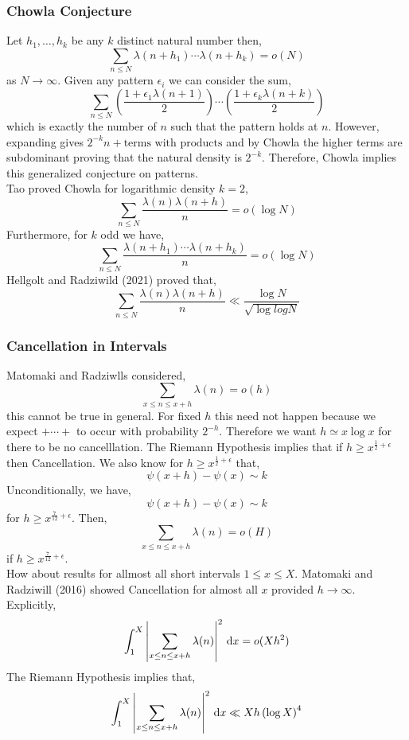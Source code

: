 \documentclass[12pt]{article}
\begin{document}
\subsubsection{Chowla Conjecture}

Let $h_1, \dots, h_k$ be any $k$ distinct natural number then,
\[ \sum_{n \le N} \lambda(n + h_1)  \cdots \lambda(n + h_k) = o(N) \]
as $N \to \infty$. Given any pattern $\epsilon_i$ we can consider the sum,
\[ \sum_{n \le N} \left( \frac{1 + \epsilon_1 \lambda(n+1)}{2} \right) \cdots \left( \frac{1 + \epsilon_k \lambda(n+k)}{2} \right) \]
which is exactly the number of $n$ such that the pattern holds at $n$. However, expanding gives $2^{-k} n + \text{terms with products}$ and by Chowla the higher terms are subdominant proving that the natural density is $2^{-k}$. Therefore, Chowla implies this generalized conjecture on patterns. 
\bigskip\\
Tao proved Chowla for logarithmic density $k = 2$,
\[ \sum_{n \le N} \frac{\lambda(n) \lambda(n + h)}{n} = o(\log{N}) \]
Furthermore, for $k$ odd we have,
\[ \sum_{n \le N} \frac{\lambda(n + h_1) \cdots \lambda(n + h_k)}{n} = o(\log{N}) \]
Hellgolt and Radziwild (2021) proved that,
\[ \sum_{n \le N} \frac{\lambda(n) \lambda(n+h)}{n} \ll \frac{\log{N}}{\sqrt{\log{log{N}}}} \]

\subsubsection{Cancellation in Intervals}

Matomaki and Radziwlls considered,
\[ \sum_{x \le n \le x + h} \lambda(n) = o(h) \]
this cannot be true in general. 
For fixed $h$ this need not happen because we expect $+ \cdots +$ to occur with probability $2^{-h}$. Therefore we want $h \simeq x \log{x}$ for there to be no cancelllation. The Riemann Hypothesis implies that if $h \ge x^{\frac{1}{2} + \epsilon}$ then Cancellation. We also know for $h \ge x^{\frac{1}{2} + \epsilon}$ that,
\[ \psi(x + h) - \psi(x) \sim k \]
Unconditionally, we have,
\[ \psi(x + h) - \psi(x) \sim k \]
for $h \ge x^{\frac{7}{12} + \epsilon}$. Then,
\[ \sum_{x \le n \le x + h} \lambda(n) = o(H) \]
if $h \ge x^{\frac{7}{12} + \epsilon}$.
\bigskip\\
How about results for allmost all short intervals $1 \le x \le X$. Matomaki and Radziwill (2016) showed Cancellation for almost all $x$ provided $h \to \infty$. Explicitly,
\[ \int_1^X \left| \sum_{x \le n \le x + h} \lambda(n) \right|^2 \, \mathrm{d}{x} = o(X h^2) \]
The Riemann Hypothesis implies that,
\[ \int_1^X \left| \sum_{x \le n \le x + h} \lambda(n) \right|^2 \, \mathrm{d}{x} \ll X h \left( \log{X} \right)^4 \]
\end{document}
